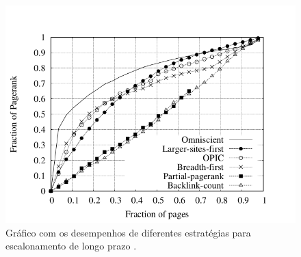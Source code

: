 \documentclass[a4paper,12pt,titlepage]{article}
\begin{document}
\begin{figure}[H]
     \centering
     \includegraphics[scale=0.6]{figures/performance.png}
     \caption{Gráfico com os desempenhos de diferentes estratégias para escalonamento de longo prazo  \cite{carlos}.}
     \label{bsp}
\end{figure}




\newpage
\end{document}
